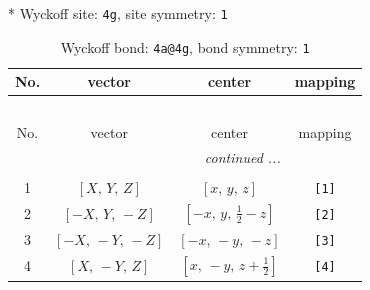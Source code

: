 \documentclass[fleqn,8pt]{jsarticle}
\begin{document}
* Wyckoff site: {\tt 4g}, site symmetry: {\tt 1}
\renewcommand{\arraystretch}{1.2}
\begin{longtable}{cccc}
\caption{Wyckoff bond: {\tt 4a@4g}, bond symmetry: {\tt 1}}
 \\
 \hline \hline
No. & vector & center & mapping \\ \hline \endfirsthead

\multicolumn{3}{l}{\tablename\ \thetable{}} \\
 \hline \hline
No. & vector & center & mapping \\ \hline \endhead

 \hline \hline
\multicolumn{3}{r}{\footnotesize\it continued ...} \\ \endfoot

 \hline \hline
\multicolumn{3}{r}{} \\ \endlastfoot

1 & $\left[ X,\, Y,\, Z \right]$ & $\left[ x,\, y,\, z \right]$ & {\tt [1]} \\ \hline
2 & $\left[ - X,\, Y,\, - Z \right]$ & $\left[ - x,\, y,\, \frac{1}{2} - z \right]$ & {\tt [2]} \\ \hline
3 & $\left[ - X,\, - Y,\, - Z \right]$ & $\left[ - x,\, - y,\, - z \right]$ & {\tt [3]} \\ \hline
4 & $\left[ X,\, - Y,\, Z \right]$ & $\left[ x,\, - y,\, z + \frac{1}{2} \right]$ & {\tt [4]} \\
\end{longtable}
\end{document}
